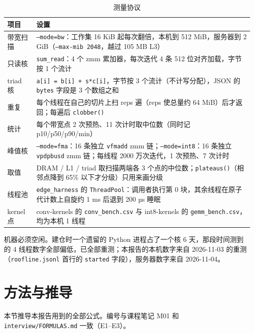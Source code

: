 \documentclass[11pt,a4paper]{ctexart}
\begin{document}
\begin{table}[H]
\centering\small
\caption{测量协议}\label{tab:protocol}
\begin{tabularx}{\linewidth}{>{\raggedright\arraybackslash}p{2.4cm} >{\raggedright\arraybackslash}X}
\toprule
项目 & 设置 \\
\midrule
带宽扫描 & \texttt{--mode=bw}：工作集 16 KiB 起每次翻倍，本机到 512 MiB，服务器到 2 GiB（\texttt{--max-mib 2048}，越过 105 MB L3） \\
只读核 & \texttt{sum\_read}：4 个 zmm 累加器，每次迭代 4 条 512 位对齐加载，字节按 1 个流计 \\
triad 核 & \texttt{a[i] = b[i] + s*c[i]}，字节按 3 个流计（不计写分配），JSON 的 \texttt{bytes} 字段是 3 个数组之和 \\
重复 & 每个线程在自己的切片上扫 reps 遍（reps 使总量约 64 MiB）后才返回；每遍后 \texttt{clobber()} \\
统计 & 每个带宽点 2 次预热、11 次计时取中位数（同时记 p10/p50/p90/min） \\
峰值核 & \texttt{--mode=fma}：16 条独立 \texttt{vfmadd} zmm 链；\texttt{--mode=int8}：16 条独立 \texttt{vpdpbusd} zmm 链；每线程 2000 万次迭代，1 次预热、7 次计时 \\
取值 & DRAM / L1 / triad 取扫描两端各 3 个点的中位数；\texttt{plateaus()}（相邻点降到 65\% 以下才分级）只用来画分级 \\
线程池 & \texttt{edge\_harness} 的 \texttt{ThreadPool}：调用者执行第 0 块，其余线程在原子代计数上自旋约 1 ms 后退到 200 µs 睡眠 \\
kernel 点 & conv-kernels 的 \texttt{conv\_bench.csv} 与 int8-kernels 的 \texttt{gemm\_bench.csv}，均为本机 1 线程 \\
\bottomrule
\end{tabularx}
\end{table}

机器必须空闲。建仓时一个遗留的 Python 进程占了一个核 6 天，那段时间测到的 4 线程数字全部偏低，已全部重测；本报告的本机数字来自 2026-11-03 的重测
（\texttt{roofline.jsonl} 首行的 \texttt{started} 字段），服务器数字来自 2026-11-04。

\section{方法与推导}\label{sec:method}

本节推导本报告用到的全部公式。编号与课程笔记 M01 和 \nolinkurl{interview/FORMULAS.md} 一致（E1--E3）。
\end{document}
